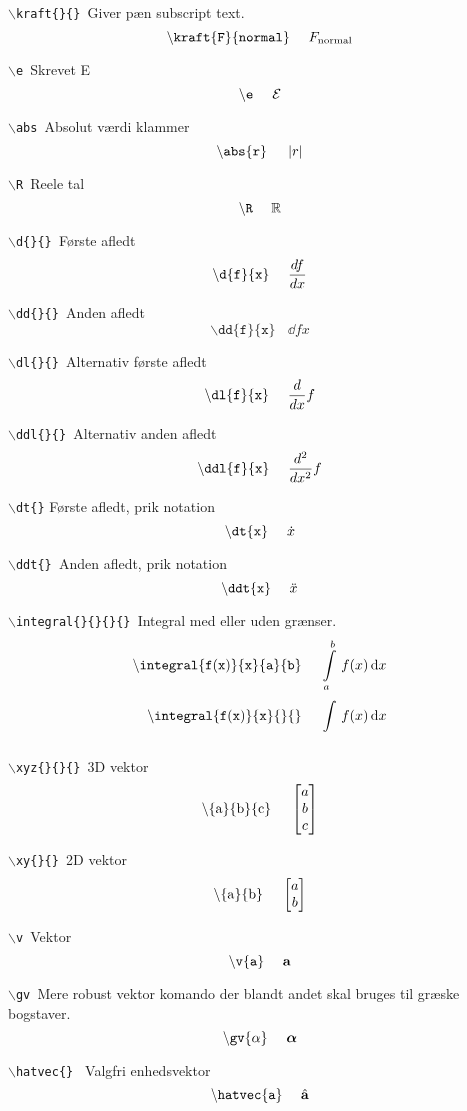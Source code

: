 \documentclass[a4paper,hidelinks,11pt]{memoir}
\begin{document}
\mainmatter

\texttt{$\backslash$kraft\{\}\{\} }Giver pæn subscript text.
$$
\mathtt{\backslash kraft\{F\}\{normal\}}~~~~\kraft{F}{normal}
$$

\texttt{$\backslash$e }Skrevet E
$$
\mathtt{\backslash e}~~~~\e
$$

\texttt{$\backslash$abs }Absolut værdi klammer
$$
\mathtt{\backslash abs\{r\}}~~~~\abs{r}
$$

\texttt{$\backslash$R }Reele tal
$$
\mathtt{\backslash R}~~~~\R
$$

\texttt{$\backslash$d\{\}\{\} }Første afledt
$$
\mathtt{\backslash d \{ f\} \{ x\} }~~~~\d{f}{x}
$$ 

\texttt{$\backslash$dd\{\}\{\} }Anden afledt
$$
\mathtt{\backslash dd \{ f\} \{ x\} }~~~~\dd{f}{x}
$$ 

\texttt{$\backslash$dl\{\}\{\} }Alternativ første afledt
$$
\mathtt{\backslash dl \{ f\} \{ x\} }~~~~\dl{f}{x}
$$ 

\texttt{$\backslash$ddl\{\}\{\} }Alternativ anden afledt
$$
\mathtt{\backslash ddl \{ f\} \{ x\} }~~~~\ddl{f}{x}
$$

\texttt{$\backslash$dt\{\}} Første afledt, prik notation
$$
\mathtt{\backslash dt \{ x\} }~~~~\dt{x}
$$ 

\texttt{$\backslash$ddt\{\} }Anden afledt, prik notation
$$
\mathtt{\backslash ddt \{ x\} }~~~~\ddt{x}
$$ 

\texttt{$\backslash$integral\{\}\{\}\{\}\{\} }Integral med eller uden grænser.
\begin{align*}
\mathtt{\backslash integral\{ f(x)\}\{ x\}\{a\}\{ b\}}~~~~&\integral{f(x)}{x}{a}{b}\\
\mathtt{\backslash integral\{ f(x)\}\{ x\}\{ \}\{ \}}~~~~&\integral{f(x)}{x}{}{}
\end{align*}

\texttt{$\backslash$xyz\{\}\{\}\{\} }3D vektor
$$
\mathrm{\backslash\{ a\}\{ b\}\{ c\}}~~~~\xyz{a}{b}{c}
$$

\texttt{$\backslash$xy\{\}\{\} }2D vektor
$$
\mathrm{\backslash\{ a\}\{ b\}}~~~~\xy{a}{b}
$$

\texttt{$\backslash$v }Vektor
$$
\mathtt{\backslash v\{ a\}}~~~~\v a
$$

\texttt{$\backslash$gv }Mere robust vektor komando der blandt andet skal bruges til græske bogstaver.
$$
\mathtt{\backslash gv\{ \alpha\}}~~~~\gv{\alpha}
$$

\texttt{$\backslash$hatvec\{\} } Valgfri enhedsvektor
$$
\mathtt{\backslash hatvec\{ a\}}~~~~\hatvec{a}
$$
\end{document}
